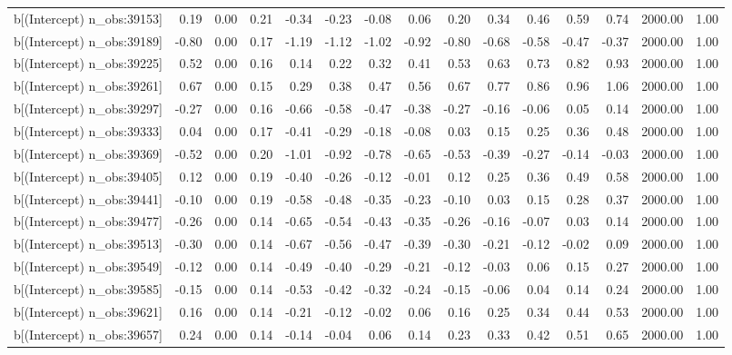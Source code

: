 \begin{table}[ht]
\begin{tabular}{rrrrrrrrrrrrrrr}
  b[(Intercept) n\_obs:39153] & 0.19 & 0.00 & 0.21 & -0.34 & -0.23 & -0.08 & 0.06 & 0.20 & 0.34 & 0.46 & 0.59 & 0.74 & 2000.00 & 1.00 \\ 
  b[(Intercept) n\_obs:39189] & -0.80 & 0.00 & 0.17 & -1.19 & -1.12 & -1.02 & -0.92 & -0.80 & -0.68 & -0.58 & -0.47 & -0.37 & 2000.00 & 1.00 \\ 
  b[(Intercept) n\_obs:39225] & 0.52 & 0.00 & 0.16 & 0.14 & 0.22 & 0.32 & 0.41 & 0.53 & 0.63 & 0.73 & 0.82 & 0.93 & 2000.00 & 1.00 \\ 
  b[(Intercept) n\_obs:39261] & 0.67 & 0.00 & 0.15 & 0.29 & 0.38 & 0.47 & 0.56 & 0.67 & 0.77 & 0.86 & 0.96 & 1.06 & 2000.00 & 1.00 \\ 
  b[(Intercept) n\_obs:39297] & -0.27 & 0.00 & 0.16 & -0.66 & -0.58 & -0.47 & -0.38 & -0.27 & -0.16 & -0.06 & 0.05 & 0.14 & 2000.00 & 1.00 \\ 
  b[(Intercept) n\_obs:39333] & 0.04 & 0.00 & 0.17 & -0.41 & -0.29 & -0.18 & -0.08 & 0.03 & 0.15 & 0.25 & 0.36 & 0.48 & 2000.00 & 1.00 \\ 
  b[(Intercept) n\_obs:39369] & -0.52 & 0.00 & 0.20 & -1.01 & -0.92 & -0.78 & -0.65 & -0.53 & -0.39 & -0.27 & -0.14 & -0.03 & 2000.00 & 1.00 \\ 
  b[(Intercept) n\_obs:39405] & 0.12 & 0.00 & 0.19 & -0.40 & -0.26 & -0.12 & -0.01 & 0.12 & 0.25 & 0.36 & 0.49 & 0.58 & 2000.00 & 1.00 \\ 
  b[(Intercept) n\_obs:39441] & -0.10 & 0.00 & 0.19 & -0.58 & -0.48 & -0.35 & -0.23 & -0.10 & 0.03 & 0.15 & 0.28 & 0.37 & 2000.00 & 1.00 \\ 
  b[(Intercept) n\_obs:39477] & -0.26 & 0.00 & 0.14 & -0.65 & -0.54 & -0.43 & -0.35 & -0.26 & -0.16 & -0.07 & 0.03 & 0.14 & 2000.00 & 1.00 \\ 
  b[(Intercept) n\_obs:39513] & -0.30 & 0.00 & 0.14 & -0.67 & -0.56 & -0.47 & -0.39 & -0.30 & -0.21 & -0.12 & -0.02 & 0.09 & 2000.00 & 1.00 \\ 
  b[(Intercept) n\_obs:39549] & -0.12 & 0.00 & 0.14 & -0.49 & -0.40 & -0.29 & -0.21 & -0.12 & -0.03 & 0.06 & 0.15 & 0.27 & 2000.00 & 1.00 \\ 
  b[(Intercept) n\_obs:39585] & -0.15 & 0.00 & 0.14 & -0.53 & -0.42 & -0.32 & -0.24 & -0.15 & -0.06 & 0.04 & 0.14 & 0.24 & 2000.00 & 1.00 \\ 
  b[(Intercept) n\_obs:39621] & 0.16 & 0.00 & 0.14 & -0.21 & -0.12 & -0.02 & 0.06 & 0.16 & 0.25 & 0.34 & 0.44 & 0.53 & 2000.00 & 1.00 \\ 
  b[(Intercept) n\_obs:39657] & 0.24 & 0.00 & 0.14 & -0.14 & -0.04 & 0.06 & 0.14 & 0.23 & 0.33 & 0.42 & 0.51 & 0.65 & 2000.00 & 1.00 \\ 

\end{tabular}
\end{table}
